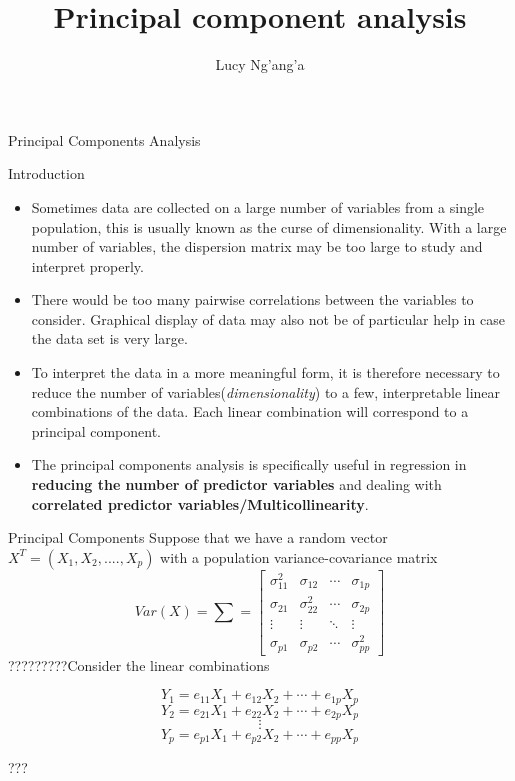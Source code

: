 \documentclass[10pt]{beamer}
\title[Probability and Statistics]{Principal component analysis}
\author{Lucy Ng'ang'a}
\begin{document}


\begin{frame}
\maketitle
\end{frame}

\begin{frame}{Principal Components Analysis}
\begin{block}{Introduction}
\begin{itemize}
\item Sometimes data are collected on a large number of variables from a single population, this is usually known as the curse of dimensionality. With a large number of variables, the dispersion matrix may be too large to study and interpret properly.
\item There would be too many pairwise correlations between the variables to consider. Graphical display of data may also not be of particular help in case the data set is very large. 
\item To interpret the data in a more meaningful form, it is therefore necessary to reduce the number of variables(\textit{dimensionality}) to a few, interpretable linear combinations of the data. Each linear combination will correspond to a principal component.
\item The principal components analysis is specifically useful in regression in \textbf{reducing the number of predictor variables} and dealing with \textbf{correlated predictor variables/Multicollinearity}.
\end{itemize}
\end{block}
\end{frame}

\begin{frame}{Principal Components}
Suppose that we have a random vector $X^{T}=(X_{1},X_{2},....,X_{p})$ with a population variance-covariance matrix 
$$ Var(X)=\sum =
\begin{bmatrix}
\sigma_{11}^{2} & \sigma_{12}&\cdots & \sigma_{1p} \\
\sigma_{21}& \sigma_{22}^{2}& \cdots& \sigma_{2p} \\
\vdots& \vdots&\ddots&\vdots\\
 \sigma_{p1}& \sigma_{p2}& \cdots& \sigma_{pp}^{2}
 \end{bmatrix}$$
 ?????????Consider the linear combinations 
 \begin{center}
 $$Y_{1}=e_{11}X_{1}+e_{12}X_{2}+\cdots+e_{1p}X_{p}$$
 $$Y_{2}=e_{21}X_{1}+e_{22}X_{2}+\cdots+e_{2p}X_{p}$$
 $$\vdots$$
 $$Y_{p}=e_{p1}X_{1}+e_{p2}X_{2}+\cdots+e_{pp}X_{p}$$
 \end{center}???
 \end{frame}
 
\end{document}
